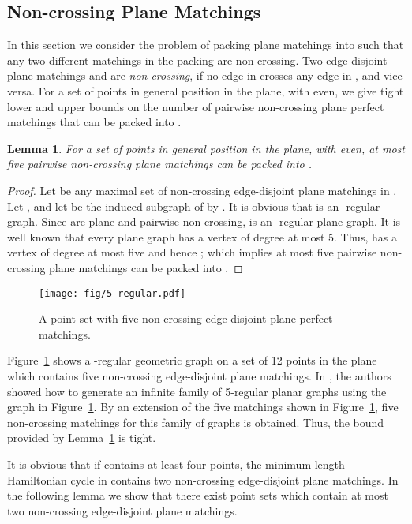 \documentclass[11pt,a4paper]{article}
\newtheorem{lemma}{Lemma}
\begin{document}
\subsection{Non-crossing Plane Matchings}
\label{non-crossing-matching-section}
In this section we consider the problem of packing plane matchings into  such that any two different matchings in the packing are non-crossing.
Two edge-disjoint plane matchings  and  are {\em non-crossing}, if no edge in  crosses any edge in , and vice versa. For a set  of  points in general position in the plane, with  even, we give tight lower and upper bounds on the number of pairwise non-crossing plane perfect matchings that can be packed into . 

\begin{lemma}
\label{5-non-crossing}
For a set  of  points in general position in the plane, with  even, at most five pairwise non-crossing plane matchings can be packed into .
\end{lemma}
\begin{proof}
 Let  be any maximal set of non-crossing edge-disjoint plane matchings in . Let , and let  be the induced subgraph of  by . It is obvious that  is an -regular graph. Since  are plane and pairwise non-crossing,  is an -regular plane graph. It is well known that every plane graph has a vertex of degree at most 5. Thus,  has a vertex of degree at most five and hence ; which implies at most five pairwise non-crossing plane matchings can be packed into .
\end{proof}

\begin{figure}[htb]
  \centering
  \texttt{[image: fig/5-regular.pdf]}
 \caption{A point set with five non-crossing edge-disjoint plane perfect matchings.}
  \label{5-regular-fig}
\end{figure}

Figure~\ref{5-regular-fig} shows a -regular geometric graph on a set of 12 points in the plane which contains five non-crossing edge-disjoint plane matchings. In \cite{Hasheminezhad2011}, the authors showed how to generate an infinite family of 5-regular planar graphs using the graph in Figure~\ref{5-regular-fig}. By an extension of the five matchings shown in Figure~\ref{5-regular-fig}, five non-crossing matchings for this family of graphs is obtained. Thus, the bound provided by Lemma~\ref{5-non-crossing} is tight.  

It is obvious that if  contains at least four points, the minimum length Hamiltonian cycle in  contains two non-crossing edge-disjoint plane matchings. In the following lemma we show that there exist point sets which contain at most two non-crossing edge-disjoint plane matchings.
\end{document}
